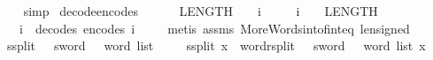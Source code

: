 \begin{isabellebody}
%
\isadelimproof
\ \ %
\endisadelimproof
%
\isatagproof
{}\isamarkupfalse%
\ simp%
\endisatagproof
{\isafoldproof}%
%
\isadelimproof
\isanewline
%
\endisadelimproof
\isanewline
{}\isamarkupfalse%
\ decode{\isacharunderscore}{\kern0pt}encode{\isacharunderscore}{\kern0pt}s{}{\isacharcolon}{\kern0pt}\isanewline
\ \ \ {\isachardoublequoteopen}{\isacharminus}{\kern0pt}\ {\isacharparenleft}{\kern0pt}{}\ {\isacharcircum}{\kern0pt}\ {\isacharparenleft}{\kern0pt}LENGTH{\isacharparenleft}{\kern0pt}{}{\isacharparenright}{\kern0pt}\ {\isacharminus}{\kern0pt}\ {}{\isacharparenright}{\kern0pt}{\isacharparenright}{\kern0pt}\ {\isasymle}\ i{\isachardoublequoteclose}\isanewline
\ \ \ \ \ {\isachardoublequoteopen}i\ {\isacharless}{\kern0pt}\ {}\ {\isacharcircum}{\kern0pt}\ {\isacharparenleft}{\kern0pt}LENGTH{\isacharparenleft}{\kern0pt}{}{\isacharparenright}{\kern0pt}\ {\isacharminus}{\kern0pt}\ {}{\isacharparenright}{\kern0pt}{\isachardoublequoteclose}\isanewline
\ \ \ {\isachardoublequoteopen}i\ {\isacharequal}{\kern0pt}\ decode{\isacharunderscore}{\kern0pt}s{}\ {\isacharparenleft}{\kern0pt}encode{\isacharunderscore}{\kern0pt}s{}\ i{\isacharparenright}{\kern0pt}{\isachardoublequoteclose}\ \isanewline
%
\isadelimproof
\ \ %
\endisadelimproof
%
\isatagproof
{}\isamarkupfalse%
\ {\isacharparenleft}{\kern0pt}metis\ assms\ More{\isacharunderscore}{\kern0pt}Word{\isachardot}{\kern0pt}sint{\isacharunderscore}{\kern0pt}of{\isacharunderscore}{\kern0pt}int{\isacharunderscore}{\kern0pt}eq\ len{\isacharunderscore}{\kern0pt}signed{\isacharparenright}{\kern0pt}%
\endisatagproof
{\isafoldproof}%
%
\isadelimproof
\isanewline
%
\endisadelimproof
\ \ \isanewline
{}\isamarkupfalse%
\ s{}{}{\isacharunderscore}{\kern0pt}split\ {\isacharcolon}{\kern0pt}{\isacharcolon}{\kern0pt}\ {\isachardoublequoteopen}{}{}\ sword\ {\isasymRightarrow}\ {}{}\ word\ list{\isachardoublequoteclose}\isanewline
\ \ \isanewline
\ \ {\isachardoublequoteopen}s{}{}{\isacharunderscore}{\kern0pt}split\ x\ {\isasymequiv}\ {\isacharparenleft}{\kern0pt}word{\isacharunderscore}{\kern0pt}rsplit\ {\isacharcolon}{\kern0pt}{\isacharcolon}{\kern0pt}\ {}{}\ sword\ {\isasymRightarrow}\ {}{}\ word\ list{\isacharparenright}{\kern0pt}\ x{\isachardoublequoteclose}\isanewline

\end{isabellebody}
